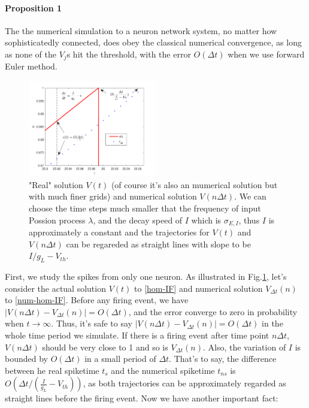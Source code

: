 \documentclass[10pt]{article}
\begin{document}
\begin{multicols}{2}
\paragraph{Proposition 1} The the numerical simulation to a neuron network system, no matter how sophisticatedly connected, does obey the classical numerical convergence, as long as none of the $V_j$s hit the threshold, with the error  $O(\Delta t)$ when we use forward Euler method. 
\begin{figure}[H] %
\includegraphics[width=0.5\textwidth]{t_error.pdf}
\caption{\color{Gray}"Real" solution $V(t)$ (of course it's also an mumerical solution but with much finer grids) and numerical solution $V(n\Delta t)$. We can choose the time steps much smaller that the frequency of input Possion process $\lambda$, and the decay speed of $I$ which is $\sigma_{E,I}$, thus $I$ is approximately a constant and the trajectories for $V(t)$ and $V(n\Delta t)$ can be regareded as straight lines with slope to be $I/g_L-V_{th}$.}

\label{t_error} %
\end{figure}
\indent
First, we study the spikes from only one neuron. As illustrated in Fig.\ref{t_error}, let's consider the actual solution $V(t)$ to \ref{hom-IF} and numerical solution $V_{\Delta t}(n)$ to \ref{num-hom-IF}. Before any firing event, we have $|V(n\Delta t)-V_{\Delta t}(n)|=O(\Delta t)$, and the error converge to zero in probability when $t\rightarrow\infty$. Thus, it's safe to say $|V(n\Delta t)-V_{\Delta t}(n)|=O(\Delta t)$ in the whole time period we simulate. If there is a firing event after time point $n\Delta t$, $V(n\Delta t)$ should be very close to 1 and so is $V_{\Delta t}(n)$. Also, the variation of $I$ is bounded by $O(\Delta t)$ in a small period of $\Delta t$. That's to say, the difference between he real spiketime $t_s$ and the numerical spiketime $t_{ns}$ is $O(\Delta t/(\frac{I}{g_L}-V_{th}))$, as both trajectories can be approximately regarded as straight lines before the firing event.  Now we have another important fact: 

\end{multicols}
\end{document}
